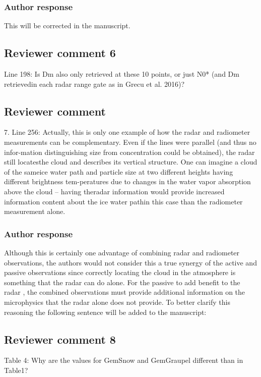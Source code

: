\documentclass[11pt]{scrartcl}
\begin{document}
\subsubsection*{Author response}
This will be corrected in the manuscript.

\subsection{Reviewer comment 6}
Line 198: Is Dm also only retrieved at these 10 points, or just N0* (and Dm retrievedin each radar range gate as in Grecu et al. 2016)?

\subsection{Reviewer comment}
7.  Line 256:  Actually, this is only one example of how the radar and radiometer measurements can be complementary.  Even if the lines were parallel (and thus no infor-mation distinguishing size from concentration could be obtained), the radar still locatesthe cloud and describes its vertical structure.  One can imagine a cloud of the sameice water path and particle size at two different heights having different brightness tem-peratures due to changes in the water vapor absorption above the cloud – having theradar information would provide increased information content about the ice water pathin this case than the radiometer measurement alone.

\subsubsection*{Author response}
Although this is certainly one advantage of combining radar and radiometer
observations, the authors would not consider this a true synergy of the active
and passive observations since correctly locating the cloud in the atmosphere is
something that the radar can do alone. For the passive to add benefit to the
radar , the combined observations must provide additional information on the
microphysics that the radar alone does not provide. To better clarify this
reasoning the following sentence will be added to the manuscript:

\subsection*{Reviewer comment 8}
Table 4: Why are the values for GemSnow and GemGraupel different than in Table1?
\end{document}
